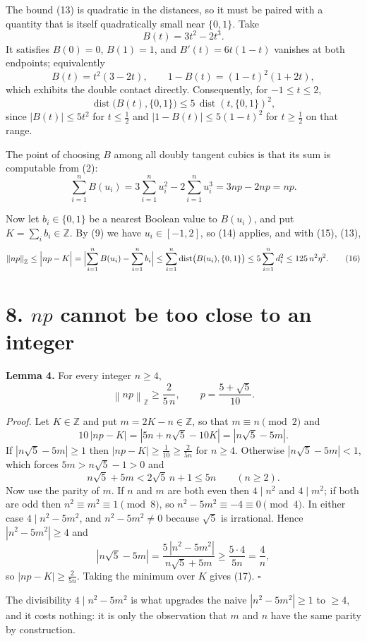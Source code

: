 \documentclass[12pt]{article}
\newcommand{\sumi}{\sum_{i=1}^{n}}
\newcommand{\dist}{\operatorname{dist}}
\newcommand{\ZZ}{\mathbb Z}
\newcommand{\normZ}[1]{\left\lVert #1\right\rVert_{\ZZ}}
\begin{document}
The bound (13) is quadratic in the distances, so it must be paired with a
quantity that is itself quadratically small near \(\{0,1\}\). Take
\[
B(t)=3t^2-2t^3 .
\]
It satisfies \(B(0)=0\), \(B(1)=1\), and \(B'(t)=6t(1-t)\) vanishes at
both endpoints; equivalently
\[
B(t)=t^2(3-2t),
\qquad
1-B(t)=(1-t)^2(1+2t),
\]
which exhibits the double contact directly. Consequently, for
\(-1\le t\le2\),
\[
\dist\bigl(B(t),\{0,1\}\bigr)\le5\,\dist(t,\{0,1\})^2 ,
\tag{14}
\]
since \(|B(t)|\le5t^2\) for \(t\le\frac12\) and
\(|1-B(t)|\le5(1-t)^2\) for \(t\ge\frac12\) on that range.

The point of choosing \(B\) among all doubly tangent cubics is that its
sum is computable from (2):
\[
\sumi B(u_i)=3\sumi u_i^2-2\sumi u_i^3=3np-2np=np .
\tag{15}
\]

Now let \(b_i\in\{0,1\}\) be a nearest Boolean value to \(B(u_i)\), and
put \(K=\sum_i b_i\in\ZZ\). By (9) we have \(u_i\in[-1,2]\), so (14)
applies, and with (15), (13),
\[
\normZ{np}\le\Bigl|np-K\Bigr|
=\Bigl|\sumi B(u_i)-\sumi b_i\Bigr|
\le\sumi\dist\bigl(B(u_i),\{0,1\}\bigr)
\le5\sumi d_i^2
\le125\,n^2\eta^2 .
\tag{16}
\]

\section*{8. \(np\) cannot be too close to an integer}

\textbf{Lemma 4.} For every integer \(n\ge4\),
\[
\normZ{np}\ge\frac{2}{5\,n},
\qquad p=\frac{5+\sqrt5}{10}.
\tag{17}
\]

\textit{Proof.} Let \(K\in\ZZ\) and put \(m=2K-n\in\ZZ\), so that
\(m\equiv n\pmod 2\) and
\[
10\,|np-K|=|5n+n\sqrt5-10K|=|n\sqrt5-5m| .
\]
If \(|n\sqrt5-5m|\ge1\) then \(|np-K|\ge\frac1{10}\ge\frac2{5n}\) for
\(n\ge4\). Otherwise \(|n\sqrt5-5m|<1\), which forces \(5m>n\sqrt5-1>0\)
and
\[
n\sqrt5+5m<2\sqrt5\,n+1\le5n\qquad(n\ge2).
\]
Now use the parity of \(m\). If \(n\) and \(m\) are both even then
\(4\mid n^2\) and \(4\mid m^2\); if both are odd then \(n^2\equiv m^2\equiv1
\pmod 8\), so \(n^2-5m^2\equiv-4\equiv0\pmod4\). In either case
\(4\mid n^2-5m^2\), and \(n^2-5m^2\ne0\) because \(\sqrt5\) is
irrational. Hence \(|n^2-5m^2|\ge4\) and
\[
|n\sqrt5-5m|=\frac{5\,|n^2-5m^2|}{n\sqrt5+5m}\ge\frac{5\cdot4}{5n}=\frac4n ,
\]
so \(|np-K|\ge\frac{2}{5n}\). Taking the minimum over \(K\) gives (17).
\(\square\)

The divisibility \(4\mid n^2-5m^2\) is what upgrades the naive
\(|n^2-5m^2|\ge1\) to \(\ge4\), and it costs nothing: it is only the
observation that \(m\) and \(n\) have the same parity by construction.
\end{document}
